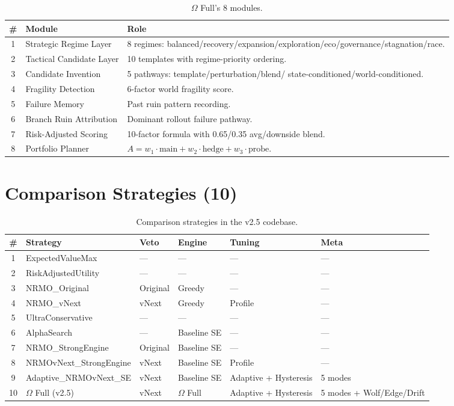 \begin{table}[ht]
\centering
\small
\begin{tabularx}{\linewidth}{cXX}
\toprule
\textbf{\#} & \textbf{Module} & \textbf{Role} \\
\midrule
1 & Strategic Regime Layer & 8 regimes:
balanced/recovery/expansion/exploration/eco/governance/stagnation/race. \\
2 & Tactical Candidate Layer & 10 templates with regime-priority
ordering. \\
3 & Candidate Invention & 5 pathways: template/perturbation/blend/
state-conditioned/world-conditioned. \\
4 & Fragility Detection & 6-factor world fragility score. \\
5 & Failure Memory & Past ruin pattern recording. \\
6 & Branch Ruin Attribution & Dominant rollout failure pathway. \\
7 & Risk-Adjusted Scoring & 10-factor formula with
0.65/0.35 avg/downside blend. \\
8 & Portfolio Planner & $A = w_1 \cdot \text{main} +
w_2 \cdot \text{hedge} + w_3 \cdot \text{probe}$. \\
\bottomrule
\end{tabularx}
\caption[Omega Full 8 modules]{$\Omega$ Full's 8 modules.}
\label{tab:impl-omega-modules}
\end{table}

\section{Comparison Strategies (10)}
\label{sec:impl-strategies}

\begin{table}[ht]
\centering
\small
\begin{tabularx}{\linewidth}{cXXXXX}
\toprule
\textbf{\#} & \textbf{Strategy} & \textbf{Veto} & \textbf{Engine} &
\textbf{Tuning} & \textbf{Meta} \\
\midrule
1 & ExpectedValueMax & --- & --- & --- & --- \\
2 & RiskAdjustedUtility & --- & --- & --- & --- \\
3 & NRMO\_Original & Original & Greedy & --- & --- \\
4 & NRMO\_vNext & vNext & Greedy & Profile & --- \\
5 & UltraConservative & --- & --- & --- & --- \\
6 & AlphaSearch & --- & Baseline SE & --- & --- \\
7 & NRMO\_StrongEngine & Original & Baseline SE & --- & --- \\
8 & NRMOvNext\_StrongEngine & vNext & Baseline SE & Profile & --- \\
9 & Adaptive\_NRMOvNext\_SE & vNext & Baseline SE
& Adaptive + Hysteresis & 5 modes \\
10 & $\Omega$ Full (v2.5) & vNext & $\Omega$ Full
& Adaptive + Hysteresis & 5 modes + Wolf/Edge/Drift \\
\bottomrule
\end{tabularx}
\caption[Comparison strategies]{Comparison strategies in the v2.5
codebase.}
\label{tab:impl-strategies}
\end{table}

